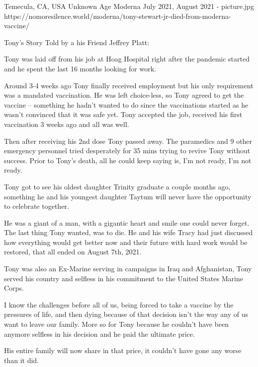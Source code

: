 {Temecula, CA, USA}
{Unknown Age}
{Moderna}
{July 2021, August 2021}
{-}
{picture.jpg}
{https://nomoresilence.world/moderna/tony-stewart-jr-died-from-moderna-vaccine/}
{



Tony’s Story Told by a his Friend Jeffrey Platt:


Tony was laid off from his job at Hoag Hospital right after the pandemic started and he spent the last 16 months looking for work.

Around 3-4 weeks ago Tony finally received employment but his only requirement was a mandated vaccination. He was left choice-less, so Tony agreed to get the vaccine – something he hadn’t wanted to do since the vaccinations started as he wasn’t convinced that it was safe yet. Tony accepted the job, received his first vaccination 3 weeks ago and all was well.


Then after receiving his 2nd dose Tony passed away. The paramedics and 9 other emergency personnel tried desperately for 35 mins trying to revive Tony without success. Prior to Tony’s death, all he could keep saying is, I’m not ready, I’m not ready.


Tony got to see his oldest daughter Trinity graduate a couple months ago, something he and his youngest daughter Taytum will never have the opportunity to celebrate together.


He was a giant of a man, with a gigantic heart and smile one could never forget. The last thing Tony wanted, was to die. He and his wife Tracy had just discussed how everything would get better now and their future with hard work would be restored, that all ended on August 7th, 2021.


Tony was also an Ex-Marine serving in campaigns in Iraq and Afghanistan, Tony served his country and selfless in his commitment to the United States Marine Corps.


I know the challenges before all of us, being forced to take a vaccine by the pressures of life, and then dying because of that decision isn’t the way any of us want to leave our family. More so for Tony because he couldn’t have been anymore selfless in his decision and he paid the ultimate price.

His entire family will now share in that price, it couldn’t have gone any worse than it did.}
